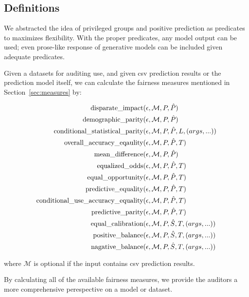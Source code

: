 \documentclass[conference]{IEEEtran}
\begin{document}
\subsection{Definitions}
We abstracted the idea of privileged groups and positive prediction as predicates to maximizes flexibility. With the proper predicates, any model output can be used; even prose-like response of generative models can be included given adequate predicates.

Given a datasets for auditing use, and given csv prediction results or the prediction model itself, we can calculate the fairness measures mentioned in Section~\ref{sec:measures} by:

\begin{align*}
\text{disparate\_impact} & (\epsilon, \mathcal{M}, P, \hat{P}) \\
\text{demographic\_parity} & (\epsilon, \mathcal{M}, P, \hat{P}) \\
\text{conditional\_statistical\_parity} & (\epsilon, \mathcal{M}, P, \hat{P}, L, (args, ...)) \\
\text{overall\_accuracy\_eqaulity} & (\epsilon, \mathcal{M}, P, \hat{P}, T) \\
\text{mean\_difference} & (\epsilon, \mathcal{M}, P, \hat{P}) \\
\text{equalized\_odds} & (\epsilon, \mathcal{M}, P, \hat{P}, T) \\
\text{equal\_opportunity} & (\epsilon, \mathcal{M}, P, \hat{P}, T) \\
\text{predictive\_equality} & (\epsilon, \mathcal{M}, P, \hat{P}, T) \\
\text{conditional\_use\_accuracy\_equality} & (\epsilon, \mathcal{M}, P, \hat{P}, T) \\
\text{predictive\_parity} & (\epsilon, \mathcal{M}, P, \hat{P}, T) \\
\text{equal\_calibration} & (\epsilon, \mathcal{M}, P, \hat{S}, T, (args, ...)) \\
\text{positive\_balance} & (\epsilon, \mathcal{M}, P, \hat{S}, T, (args, ...)) \\
\text{nagative\_balance} & (\epsilon, \mathcal{M}, P, \hat{S}, T, (args, ...)) \\
\end{align*}

where $\mathcal{M}$ is optional if the input contains csv prediction results.

By calculating all of the available fairness measures, we provide the auditors a more comprehensive perespective on a model or dataset.
\end{document}
